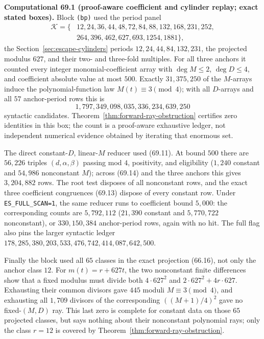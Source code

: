 \documentclass[10pt,reqno]{amsart}
\theoremstyle{definition}
\newcommand{\1}{\mathbf 1}
\begin{document}
\medskip\noindent\textbf{Computational 69.1 (proof-aware coefficient and
cylinder replay; exact stated boxes).}
Block \texttt{(bp)} used the period panel
\begin{equation}\tag{69.14}
 \begin{split}
 \mathcal K=\{&12,24,36,44,48,72,84,88,132,168,231,252,\\
             &264,396,462,627,693,1254,1881\},
 \end{split}
\end{equation}
the Section~\ref{sec:escape-cylinders} periods $12,24,44,84,132,231$, the
projected modulus $627$, and their two- and three-fold multiples.  For all
three anchors it counted every integer monomial-coefficient array with
$\deg M\leq2$, $\deg D\leq4$, and coefficient absolute value at most $500$.
Exactly $31{,}375{,}250$ of the $M$-arrays induce the polynomial-function
law $M(t)\equiv3\pmod4$; with all $D$-arrays and all $57$ anchor-period rows
this is
\begin{equation}\tag{69.15}
                    1{,}797{,}349{,}098{,}035{,}336{,}234{,}639{,}250
\end{equation}
syntactic candidates.  Theorem~\ref{thm:forward-ray-obstruction} certifies
zero identities in this box; the count is a proof-aware exhaustive ledger,
not independent numerical evidence obtained by iterating that enormous set.

The direct constant-$D$, linear-$M$ reducer used (69.11).  At bound $500$
there are $56{,}226$ triples $(d,\alpha,\beta)$ passing mod $4$, positivity,
and eligibility ($1{,}240$ constant and $54{,}986$ nonconstant $M$); across
(69.14) and the three anchors this gives $3{,}204{,}882$ rows.  The root test
disposes of all nonconstant rows, and the exact three coefficient
congruences (69.13) dispose of every constant row.  Under
\texttt{ES\_FULL\_SCAN=1}, the same reducer runs to coefficient bound
$5{,}000$: the corresponding counts are $5{,}792{,}112$ ($21{,}390$
constant and $5{,}770{,}722$ nonconstant), or $330{,}150{,}384$
anchor-period rows, again with no hit.  The full flag also pins the larger
syntactic ledger
$178{,}285{,}380{,}203{,}533{,}476{,}742{,}414{,}087{,}642{,}500$.

Finally the block used all $65$ classes in the exact projection (66.16), not
only the anchor class $12$.  For $m(t)=r+627t$, the two nonconstant finite
differences show that a fixed modulus must divide both $4\cdot627^2$ and
$2\cdot627^2+4r\cdot627$.  Exhausting their common divisors gave $445$
moduli $M\equiv3\pmod4$, and exhausting all $1{,}709$ divisors of the
corresponding $((M+1)/4)^2$ gave no fixed-$(M,D)$ ray.  This last zero is
complete for constant data on those $65$ projected classes, but says nothing
about their nonconstant polynomial rays; only the class $r=12$ is covered
by Theorem~\ref{thm:forward-ray-obstruction}.
\end{document}
